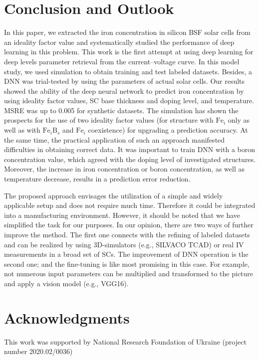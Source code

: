 \documentclass[num-refs]{wiley-article} %
\begin{document}
\section{Conclusion and Outlook}
In this paper,
we extracted the iron concentration in silicon BSF solar cells from an
ideality factor value and systematically studied the performance
of deep learning in this problem.
This work  is the first attempt at using deep learning for deep levels parameter retrieval from the current--voltage curve.
In this model study, we used simulation to obtain training and test labeled datasets.
Besides, a DNN was trial-tested by using the parameters of actual solar cells.
Our results showed the ability of the deep neural network
to predict iron concentration by using ideality factor values,
SC base thickness and doping level, and temperature.
MSRE was up to 0.005 for synthetic datasets.
The simulation has shown the prospects for the use of two ideality factor values  (for structure with $\mathrm{Fe}_i$ only as well as with $\mathrm{Fe}_i\mathrm{B}_s$ and $\mathrm{Fe}_i$ coexistence)
for upgrading  a prediction accuracy.
At the same time, the practical application of such an approach manifested difficulties in obtaining correct data.
It was important to train DNN with a boron concentration value,
which agreed with the doping level of investigated structures.
Moreover, the increase in iron concentration or boron concentration, as well as temperature decrease,
results in a prediction error reduction.

The proposed approach envisages
the utilization of a simple and widely applicable setup and
does not require much time.
Therefore it could be integrated into a manufacturing environment.
However, it should be noted that we have simplified the task for our purposes.
In our opinion, there are two ways of further improve the method.
The first one connects with the refining of labeled datasets and can be realized by
using 3D-simulators (e.g., SILVACO TCAD) or real IV measurements in a broad set of SCs.
The improvement of DNN operation is the second one;
and the fine-tuning is like most promising in this case.
For example,
not numerous input parameters can be multiplied and transformed to the picture and
apply a vision model (e.g., VGG16).



\section*{Acknowledgments}
This work was supported by National Research Foundation  of Ukraine
(project number 2020.02/0036)
\end{document}
